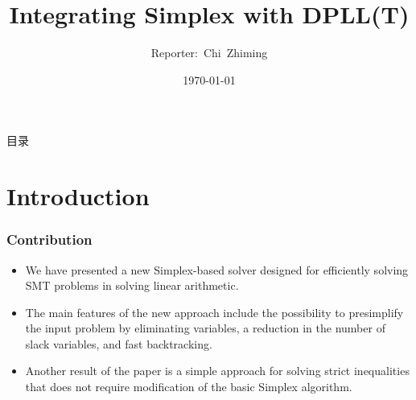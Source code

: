 \documentclass[aspectratio=169%
,serif,mathserif]{beamer}
\begin{document}
\title{Integrating Simplex with DPLL(T)} %
\author[迟智名]{Reporter:~Chi~Zhiming} %
\institute[ISCAS] %
{	
}
	\CTEXoptions[today=old]
	\date{\today} %
\begin{frame}[plain]\vspace{1.5em}
\titlepage\vspace{-0.5cm}
\end{frame}
\begin{frame}{目录}
\tableofcontents
\end{frame}

\section{Introduction} %
\begin{frame}
	\frametitle{Contribution}
	\begin{itemize}
		\item We have presented a new Simplex-based solver designed for efficiently solving SMT problems in solving linear arithmetic.
		\item The main features of the new approach include the possibility to presimplify the input problem by eliminating variables, a reduction in the number of slack variables, and fast backtracking.
		\item Another result of the paper is a simple approach for solving strict inequalities that does not require modification of the basic Simplex algorithm.
	\end{itemize}

\end{frame}
\end{document}
